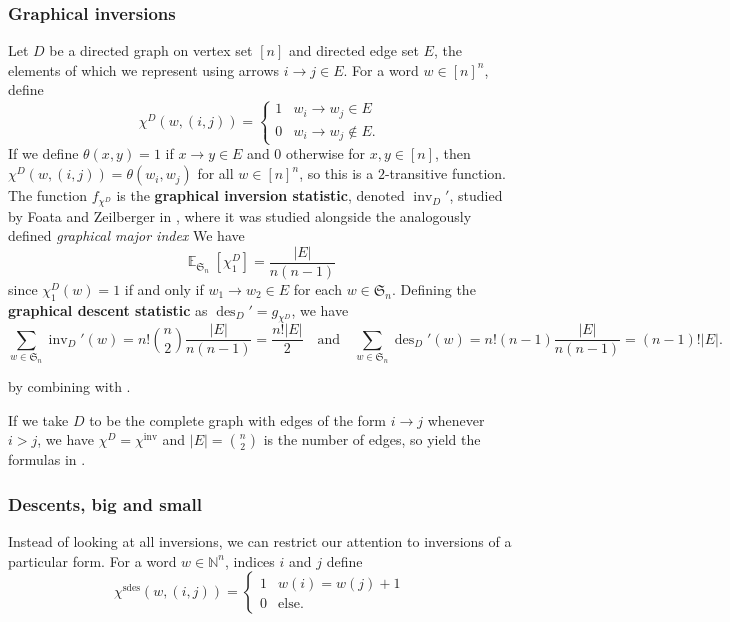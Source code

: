 \documentclass{amsart}
\newcommand{\N}{\mathbb{N}}
\renewcommand{\S}{\mathfrak{S}}
\DeclareMathOperator{\des}{des}
\DeclareMathOperator{\inv}{inv}
\DeclareMathOperator{\sdes}{sdes}
\DeclareMathOperator{\E}{\mathbb{E}}
\theoremstyle{definition}
\begin{document}
\subsubsection{Graphical inversions}
Let $D$ be a directed graph on vertex set $[n]$ and directed edge set $E$, the elements of which we represent using arrows $i\to j\in E$. For a word $w\in [n]^n$, define 
\[\chi^{D}(w,(i,j))=\begin{cases}
    1&w_i\to w_j\in E\\
    0&w_i\to w_j\not\in E.
\end{cases}\]
If we define  $\theta(x,y)=1$ if $x\to y\in E$ and $0$ otherwise for $x,y\in [n]$, then $\chi^D(w,(i,j))=\theta(w_i,w_j)$ for all $w\in [n]^n$, so this is a $2$-transitive function. The function $f_{\chi^{D}}$ is the \textbf{graphical inversion statistic}, denoted  $\inv_D'$, studied by Foata and Zeilberger in \cite{FOATA199679}, where it was studied alongside the analogously defined \textit{graphical major index} We have
\begin{equation}\label{eq:Gmaj-chi1}\E_{\S_n}[\chi_1^D]=\frac{|E|}{n(n-1)}\end{equation}
since $\chi^D_1(w)=1$ if and only if $w_1\to w_2\in E$ for each $w\in \S_n$. Defining the \textbf{graphical descent statistic } as $\des_D'=g_{\chi^D}$, we have
\begin{equation}\label{eq:graphical-equations}
\sum_{w\in \S_n}\inv_D'(w)=n!\binom{n}{2}\frac{|E|}{n(n-1)}=\frac{n!|E|}{2}\quad \mbox{and}\quad\sum_{w\in \S_n}\des_D'(w)=n!(n-1)\frac{|E|}{n(n-1)}=(n-1)!|E|.
\end{equation}

by combining  with .

If we take $D$ to be the complete graph with edges of the form $i\to j$ whenever $i>j$, we have $\chi^D=\chi^{\inv}$ and $|E|=\binom{n}{2}$ is the number of edges, so  yield the formulas in .

\subsubsection{Descents, big and small}
Instead of looking at all inversions, we can restrict our attention to inversions of a particular form. For a word $w\in \N^n$, indices $i$ and $j$  define
\[\chi^{\sdes}(w,(i,j)) =   \begin{cases}
    1 & w(i)=w(j)+1\\
    0 & \text{else.}
\end{cases}  \]
 
\end{document}

